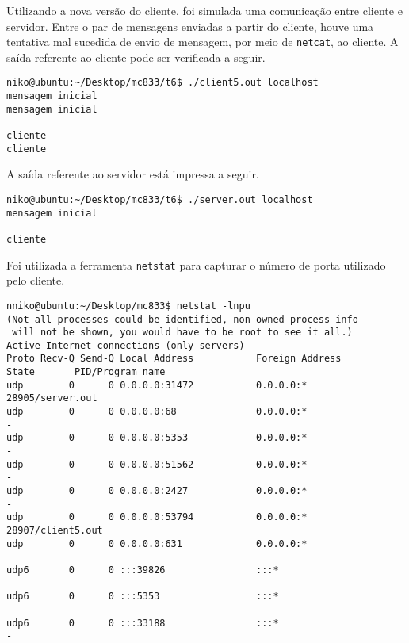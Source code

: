 \documentclass[a4paper,10pt]{article}
\begin{document}
Utilizando a nova versão do cliente, foi simulada uma comunicação entre cliente e servidor. Entre o par de mensagens enviadas a partir do cliente, houve uma tentativa mal sucedida de envio de mensagem, por meio de {\tt netcat}, ao cliente. A saída referente ao cliente pode ser verificada a seguir.

\begin{lstlisting}
niko@ubuntu:~/Desktop/mc833/t6$ ./client5.out localhost
mensagem inicial
mensagem inicial

cliente
cliente

\end{lstlisting}

A saída referente ao servidor está impressa a seguir.

\begin{lstlisting}
niko@ubuntu:~/Desktop/mc833/t6$ ./server.out localhost
mensagem inicial

cliente

\end{lstlisting}

Foi utilizada a ferramenta {\tt netstat} para capturar o número de porta utilizado pelo cliente.

\begin{lstlisting}
nniko@ubuntu:~/Desktop/mc833$ netstat -lnpu
(Not all processes could be identified, non-owned process info
 will not be shown, you would have to be root to see it all.)
Active Internet connections (only servers)
Proto Recv-Q Send-Q Local Address           Foreign Address         State       PID/Program name
udp        0      0 0.0.0.0:31472           0.0.0.0:*                           28905/server.out
udp        0      0 0.0.0.0:68              0.0.0.0:*                           -               
udp        0      0 0.0.0.0:5353            0.0.0.0:*                           -               
udp        0      0 0.0.0.0:51562           0.0.0.0:*                           -               
udp        0      0 0.0.0.0:2427            0.0.0.0:*                           -               
udp        0      0 0.0.0.0:53794           0.0.0.0:*                           28907/client5.out
udp        0      0 0.0.0.0:631             0.0.0.0:*                           -               
udp6       0      0 :::39826                :::*                                -               
udp6       0      0 :::5353                 :::*                                -               
udp6       0      0 :::33188                :::*                                -               

\end{lstlisting}
\end{document}
